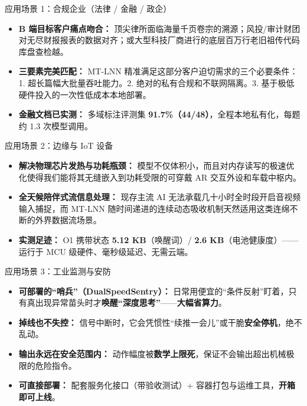 \documentclass[aspectratio=169, 10pt]{beamer}
\begin{document}
\begin{frame}{应用场景 1：合规企业（法律 / 金融 / 政企）}
\begin{itemize}
    \item \textbf{B 端目标客户痛点吻合：}
        顶尖律所面临海量千页卷宗的溯源；风投/审计财团对无尽财报报表的数据对齐；或大型科技厂商进行的底层百万行老旧祖传代码库盘查检越。
    \item \textbf{三要素完美匹配：} MT-LNN 精准满足这部分客户迫切需求的三个必要条件：1. 超长篇幅大批量吞吐能力。2. 绝对的私有合规和不联网隔离。3. 基于极低硬件投入的一次性低成本本地部署。
    \item \textbf{金融文档已实测：} 多域标注评测集 \textbf{91.7\%（44/48）}，全程本地私有化，每题约 1.3 次模型调用。
\end{itemize}
\end{frame}

\begin{frame}{应用场景 2：边缘与 IoT 设备}
\begin{itemize}
    \item \textbf{解决物理芯片发热与功耗瓶颈：} 模型不仅体积小，而且对内存读写的极速优化使得我们能将其无缝嵌入到功耗受限的可穿戴 AR 交互外设和车载中枢内。
    \item \textbf{全天候陪伴式流信息处理：} 现存主流 AI 无法承载几十小时全时段开启音视频输入捕捉，而 MT-LNN 随时间递进的连续动态吸收机制天然适用这类连绵不断的外界数据流场景。
    \item \textbf{实测足迹：} O1 携带状态 \textbf{5.12 KB}（唤醒词）/ \textbf{2.6 KB}（电池健康度）—— 运行于 MCU 级硬件、毫秒级延迟、无需云端。
\end{itemize}
\end{frame}

\begin{frame}{应用场景 3：工业监测与安防}
\begin{itemize}
    \item \textbf{可部署的“哨兵”（DualSpeedSentry）：} 日常用便宜的“条件反射”盯着，只有真出现异常苗头时才\textbf{唤醒“深度思考”}——\textbf{大幅省算力}。
    \item \textbf{掉线也不失控：} 信号中断时，它会凭惯性“续推一会儿”或干脆\textbf{安全停机}，绝不乱动。
    \item \textbf{输出永远在安全范围内：} 动作幅度被\textbf{数学上限死}，保证不会输出超出机械极限的危险指令。
    \item \textbf{可直接部署：} 配套服务化接口（带验收测试）+ 容器打包与运维工具，\textbf{开箱即可上线}。
\end{itemize}
\end{frame}
\end{document}
